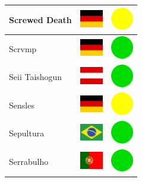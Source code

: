 \documentclass[12pt, a4paper, twoside]{report}
\begin{document}
\begin{center}
\begin{longtable}{|p{5cm}|p{2cm}|p{2cm}|}
 Screwed Death                                              & \includegraphics[width=1cm]{../4x3/de} &   \includegraphics[width=1cm]{../likes/m} \\ \hline
 Scrvmp                                                     & \includegraphics[width=1cm]{../4x3/de} &   \includegraphics[width=1cm]{../likes/y} \\ \hline
 Seii Taishogun                                             & \includegraphics[width=1cm]{../4x3/at} &   \includegraphics[width=1cm]{../likes/y} \\ \hline
 Sensles                                                    & \includegraphics[width=1cm]{../4x3/de} &   \includegraphics[width=1cm]{../likes/m} \\ \hline
 Sepultura                                                  & \includegraphics[width=1cm]{../4x3/br} &   \includegraphics[width=1cm]{../likes/y} \\ \hline
 Serrabulho                                                 & \includegraphics[width=1cm]{../4x3/pt} &   \includegraphics[width=1cm]{../likes/y} \\ \hline

\end{longtable}
\end{center}
\end{document}
